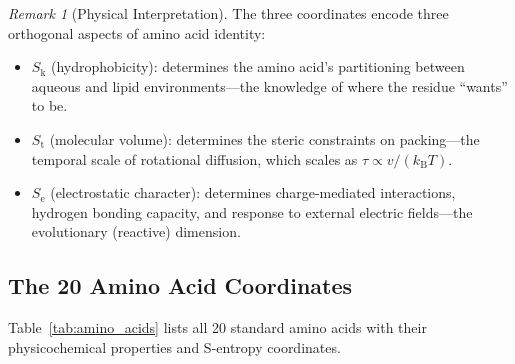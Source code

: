 \documentclass[11pt,twocolumn,a4paper]{article}
\theoremstyle{definition}
\theoremstyle{remark}
\newtheorem{remark}[theorem]{Remark}
\newcommand{\kB}{k_{\mathrm{B}}}
\newcommand{\Sk}{S_{\mathrm{k}}}
\newcommand{\St}{S_{\mathrm{t}}}
\newcommand{\Se}{S_{\mathrm{e}}}
\begin{document}
\begin{remark}[Physical Interpretation]
The three coordinates encode three orthogonal aspects of amino acid identity:
\begin{itemize}[nosep]
\item $\Sk$ (hydrophobicity): determines the amino acid's partitioning between aqueous and lipid environments---the knowledge of where the residue ``wants'' to be.
\item $\St$ (molecular volume): determines the steric constraints on packing---the temporal scale of rotational diffusion, which scales as $\tau \propto v/(\kB T)$.
\item $\Se$ (electrostatic character): determines charge-mediated interactions, hydrogen bonding capacity, and response to external electric fields---the evolutionary (reactive) dimension.
\end{itemize}
\end{remark}

\subsection{The 20 Amino Acid Coordinates}

Table~\ref{tab:amino_acids} lists all 20 standard amino acids with their physicochemical properties and S-entropy coordinates.
\end{document}
